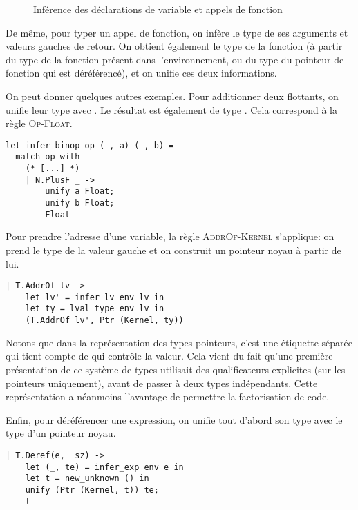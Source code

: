 \begin{figure}[h] %


\caption{Inférence des déclarations de variable et appels de
         fonction}

\label{fig:implem-unif-stmt}
\end{figure}%

De même, pour typer un appel de fonction, on infère le type de ses arguments et
valeurs gauches de retour. On obtient également le type de la fonction (à partir
du type de la fonction présent dans l'environnement, ou du type du pointeur de
fonction qui est déréférencé), et on unifie ces deux informations.

On peut donner quelques autres exemples. Pour additionner deux flottants, on
unifie leur type avec \tFloat. Le résultat est également de type \tFloat. Cela
correspond à la règle \textsc{Op-Float}.

\begin{verbatim}
let infer_binop op (_, a) (_, b) =
  match op with
    (* [...] *)
    | N.PlusF _ ->
        unify a Float;
        unify b Float;
        Float
\end{verbatim}

Pour prendre l'adresse d'une variable, la règle \textsc{AddrOf-Kernel}
s'applique: on prend le type de la valeur gauche et on construit un pointeur
noyau à partir de lui.

\begin{verbatim}
| T.AddrOf lv ->
    let lv' = infer_lv env lv in
    let ty = lval_type env lv in
    (T.AddrOf lv', Ptr (Kernel, ty))
\end{verbatim}

\label{page:qualifs-pas-qualifs}
Notons que dans la représentation des types pointeurs, c'est une étiquette
séparée qui tient compte de qui contrôle la valeur. Cela vient du fait qu'une
première présentation de ce système de types utilisait des qualificateurs
explicites (sur les pointeurs uniquement), avant de passer à deux types
indépendants. Cette représentation a néanmoins l'avantage de permettre la
factorisation de code.

Enfin, pour déréférencer une expression, on unifie tout d'abord son type avec le
type d'un pointeur noyau.

\begin{verbatim}
| T.Deref(e, _sz) ->
    let (_, te) = infer_exp env e in
    let t = new_unknown () in
    unify (Ptr (Kernel, t)) te;
    t
\end{verbatim}

